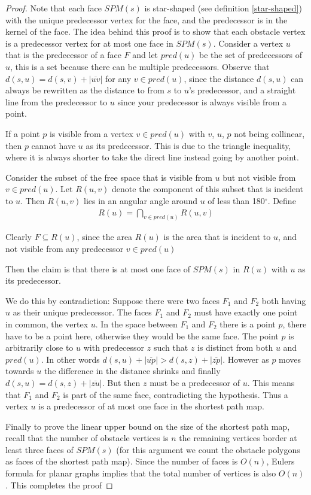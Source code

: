 \begin{proof}
	Note that each face $SPM(s)$ is star-shaped (see definition
	\ref{star-shaped})
	with the unique predecessor vertex for the face, and the predecessor is in
	the kernel of the face.
	The idea behind this proof is to show that each obstacle vertex is a
	predecessor vertex for at most one face in $SPM(s)$.
	Consider a vertex $u$ that is the predecessor of a face $F$ and let
	$pred(u)$ be the set of predecessors of $u$, this is a set because there can
	be multiple predecessors. Observe that $d(s,u)=d(s,v)+|\overline{uv}|$ for
	any $v\in pred(u)$, since the distance $d(s,u)$ can always be rewritten as
	the distance to from $s$ to $u$'s predecessor, and a straight line from the
	predecessor to $u$ since your predecessor is always visible from a point.

	If a point $p$ is visible from a vertex $v \in pred(u)$ with $v$, $u$, $p$ 
    not being collinear, then $p$ cannot have $u$ as its predecessor. This is 
    due to the triangle inequality, where it is always shorter to take the direct 
    line instead going by another point.


	Consider the subset of the free space that is visible from $u$
	but not visible from $v\in pred(u)$. Let $R(u,v)$ denote the component of
	this subset that is incident to $u$. Then $R(u,v)$ lies in an
	angular angle around $u$ of less than 180$^\circ$. Define
	\begin{align}
		R(u) =  \bigcap_{v\in pred(u)} R(u,v)
	\end{align}

	Clearly $F \subseteq R(u)$, since the area $R(u)$ is the area that is
	incident to $u$, and not visible from any predecessor $v\in pred(u)$ 
	
	Then the claim is that there is at most one face of
	$SPM(s)$ in $R(u)$ with $u$ as its predecessor. 
	
	We do this by contradiction: 
	Suppose there were two faces
	$F_1$ and $F_2$ both having $u$ as their unique predecessor. The faces $F_1$
	and $F_2$ must have exactly one point in common, the vertex $u$. In the space
	between $F_1$ and $F_2$ there is a point $p$, there have to be a point here,
	otherwise they would be the same face. The point $p$ is arbitrarily close to $u$ with
	predecessor $z$ such that $z$ is distinct from both $u$ and $pred(u)$. In
	other words $d(s,u)+|\overline{up}|>d(s,z)+|\overline{zp}|$. However as $p$
	moves towards $u$ the difference in the distance shrinks and finally
	$d(s,u) = d(s,z)+|\overline{zu}|$. But then $z$ must be a predecessor of
	$u$. This means that $F_1$ and $F_2$ is part of the same face, contradicting
	the hypothesis. Thus a vertex $u$ is a predecessor of at most one face in
	the shortest path map.

	Finally to prove the linear upper bound on the size of the shortest path
	map, recall that the number of obstacle vertices is $n$ the remaining
	vertices border at least three faces of $SPM(s)$ (for this argument we count
	the obstacle polygons as faces of the shortest path map). Since the number
	of faces is $O(n)$, Eulers formula for planar graphs implies that the total
	number of vertices is also $O(n)$. This completes the proof
\end{proof}
